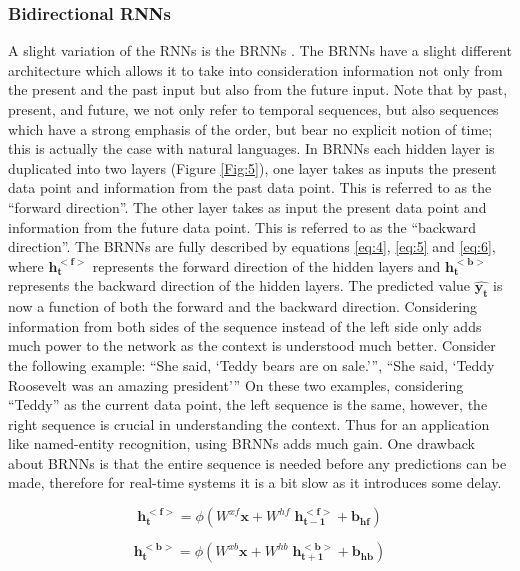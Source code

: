 \subsubsection{Bidirectional \ac{RNN}s}
\label{bg:subsub3}
A slight variation of the \ac{RNN}s is the \ac{BRNN}s \cite{schuster1997bidirectional}. The \ac{BRNN}s have a slight different architecture which allows it to take into consideration information not only from the present and the past input but also from the future input. Note that by past, present, and future, we not only refer to temporal sequences, but also sequences which have a strong emphasis of the order, but bear no explicit notion of time; this is actually the case with natural languages. In \ac{BRNN}s each hidden layer is duplicated into two layers (Figure \ref{Fig:5}), one layer takes as inputs the present data point and information from the past data point. This is referred to as the \enquote{forward direction}. The other layer takes as input the present data point and information from the future data point. This is referred to as the \enquote{backward direction}. The \ac{BRNN}s are fully described by equations \ref{eq:4}, \ref{eq:5} and \ref{eq:6}, where $ \mathbf{h_t^{<f>}} $ represents the forward direction of the hidden layers and $ \mathbf{h_t^{<b>}} $ represents the backward direction of the hidden layers. The predicted value $ \mathbf{\widehat{y_t}} $ is now a function of both the forward and the backward direction. Considering information from both sides of the sequence instead of the left side only adds much power to the network as the context is understood much better. Consider the following example: \enquote{She said, \enquote{Teddy bears are on sale.}}, \enquote{She said, \enquote{Teddy Roosevelt was an amazing president}} On these two examples, considering \enquote{Teddy} as the current data point, the left sequence is the same, however, the right sequence is crucial in understanding the context. Thus for an application like named-entity recognition, using \ac{BRNN}s adds much gain. One drawback about \ac{BRNN}s is that the entire sequence is needed before any predictions can be made, therefore for real-time systems it is a bit slow as it introduces some delay.

\begin{equation}
\label{eq:4}
\mathbf{h_t^{<f>}} = \phi(W^{xf} \mathbf{x} + W^{hf} \; \mathbf{h_{t-1}^{<f>}} + \mathbf{b_{hf}})
\end{equation}

\begin{equation}
\label{eq:5}
\mathbf{h_t^{<b>}} = \phi(W^{xb} \mathbf{x} + W^{hb} \; \mathbf{h_{t+1}^{<b>}} + \mathbf{b_{hb}})
\end{equation}

